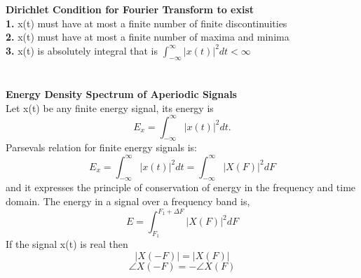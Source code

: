 \documentclass{article} %
\begin{document}
	\\
	\\
	\textbf{Dirichlet Condition for Fourier Transform to exist}\\
	\textbf{1.} x(t) must have at most a finite number of finite discontinuities\\
	\textbf{2.} x(t) must have at most a finite number of maxima and minima\\
	\textbf{3.} x(t) is absolutely integral that is $\int_{-\infty}^{\infty}|x(t)|^2dt < \infty$\\
	\\
	\\
	\textbf{Energy Density Spectrum of Aperiodic Signals}\\
	Let x(t) be any finite energy signal, its energy is
	\begin{equation}
	E_x = \int_{-\infty}^{\infty}|x(t)|^2dt.
	\end{equation}
	Parsevals relation for finite energy signals is:
	\begin{equation}
	E_x = \int_{-\infty}^{\infty}|x(t)|^2dt = \int_{-\infty}^{\infty}|X(F)|^2dF
	\end{equation}
	and it expresses the principle of conservation of energy in the frequency and time domain. The energy in a signal over a frequency 
	band is,
	\begin{equation}
	E = \int_{F_1}^{F_1+\Delta F}|X(F)|^2dF
	\end{equation}
	If the signal x(t) is real then 
	\begin{equation}
	|X(-F)| = |X(F)|
	\end{equation}
	\begin{equation}
	\angle X(-F) = -\angle X(F)
	\end{equation}
\end{document}

